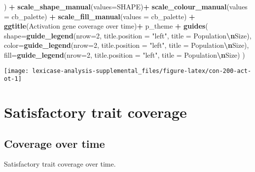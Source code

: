 \documentclass[
]{book}
\newenvironment{Shaded}{\begin{snugshade}}{\end{snugshade}}
\newcommand{\AttributeTok}[1]{\textcolor[rgb]{0.13,0.29,0.53}{#1}}
\newcommand{\DecValTok}[1]{\textcolor[rgb]{0.00,0.00,0.81}{#1}}
\newcommand{\FunctionTok}[1]{\textcolor[rgb]{0.13,0.29,0.53}{\textbf{#1}}}
\newcommand{\NormalTok}[1]{#1}
\newcommand{\SpecialCharTok}[1]{\textcolor[rgb]{0.81,0.36,0.00}{\textbf{#1}}}
\newcommand{\StringTok}[1]{\textcolor[rgb]{0.31,0.60,0.02}{#1}}
\begin{document}
\begin{Shaded}
\begin{Highlighting}[]
\NormalTok{  ) }\SpecialCharTok{+}
  \FunctionTok{scale\_shape\_manual}\NormalTok{(}\AttributeTok{values=}\NormalTok{SHAPE)}\SpecialCharTok{+}
  \FunctionTok{scale\_colour\_manual}\NormalTok{(}\AttributeTok{values =}\NormalTok{ cb\_palette) }\SpecialCharTok{+}
  \FunctionTok{scale\_fill\_manual}\NormalTok{(}\AttributeTok{values =}\NormalTok{ cb\_palette) }\SpecialCharTok{+}
  \FunctionTok{ggtitle}\NormalTok{(}\StringTok{\textquotesingle{}Activation gene coverage over time\textquotesingle{}}\NormalTok{)}\SpecialCharTok{+}
\NormalTok{  p\_theme }\SpecialCharTok{+}
  \FunctionTok{guides}\NormalTok{(}
    \AttributeTok{shape=}\FunctionTok{guide\_legend}\NormalTok{(}\AttributeTok{nrow=}\DecValTok{2}\NormalTok{, }\AttributeTok{title.position =} \StringTok{"left"}\NormalTok{, }\AttributeTok{title =} \StringTok{\textquotesingle{}Population}\SpecialCharTok{\textbackslash{}n}\StringTok{Size\textquotesingle{}}\NormalTok{),}
    \AttributeTok{color=}\FunctionTok{guide\_legend}\NormalTok{(}\AttributeTok{nrow=}\DecValTok{2}\NormalTok{, }\AttributeTok{title.position =} \StringTok{"left"}\NormalTok{, }\AttributeTok{title =} \StringTok{\textquotesingle{}Population}\SpecialCharTok{\textbackslash{}n}\StringTok{Size\textquotesingle{}}\NormalTok{),}
    \AttributeTok{fill=}\FunctionTok{guide\_legend}\NormalTok{(}\AttributeTok{nrow=}\DecValTok{2}\NormalTok{, }\AttributeTok{title.position =} \StringTok{"left"}\NormalTok{, }\AttributeTok{title =} \StringTok{\textquotesingle{}Population}\SpecialCharTok{\textbackslash{}n}\StringTok{Size\textquotesingle{}}\NormalTok{)}
\NormalTok{  )}
\end{Highlighting}
\end{Shaded}

\texttt{[image: lexicase-analysis-supplemental\_files/figure-latex/con-200-act-ot-1]}

\hypertarget{satisfactory-trait-coverage-1}{%
\section{Satisfactory trait coverage}\label{satisfactory-trait-coverage-1}}

\hypertarget{coverage-over-time-3}{%
\subsection{Coverage over time}\label{coverage-over-time-3}}

Satisfactory trait coverage over time.
\end{document}
